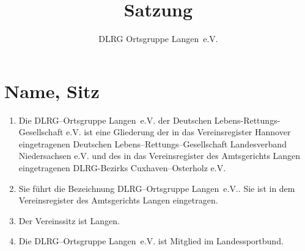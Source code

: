 \documentclass[%
12pt, %
a4paper, %
headsepline, %
footsepline, %
parskip, %
headings=normal, %
]{scrartcl}
\author{DLRG Ortsgruppe Langen~e.V.}
\title{Satzung}
\subtitle{}
\date{}
\begin{document}
\maketitle
\vspace{-0.3cm}


\section{Name, Sitz}
\label{sec:name_sitz}
\begin{enumerate}
    \item Die DLRG--Ortsgruppe Langen~e.V. der Deutschen Lebens-Rettungs-Gesellschaft e.V. ist eine Gliederung der in das Vereinsregister Hannover eingetragenen Deutschen Lebens--Rettungs--Gesellschaft Landesverband Niedersachsen e.V. und des in das Vereinsregister des Amtsgerichts Langen eingetragenen DLRG-Bezirks Cuxhaven--Osterholz e.V.
    \item Sie führt die Bezeichnung \glqq{}DLRG--Ortsgruppe Langen~e.V.\grqq{}. Sie ist in dem Vereinsregister des Amtsgerichts Langen eingetragen.
    \item Der Vereinssitz ist Langen.
    \item Die DLRG--Ortsgruppe Langen~e.V. ist Mitglied im Landessportbund.
\end{enumerate}
\end{document}
